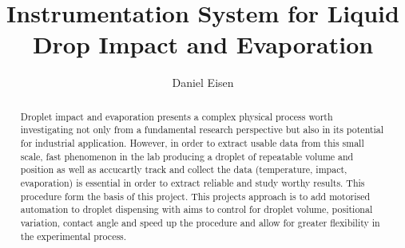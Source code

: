 \documentclass[11pt, a4paper, twoside, openright]{report}
\title{Instrumentation System for Liquid Drop Impact and Evaporation}
\author{Daniel Eisen}
\date{}
\begin{document}
\frontmatter

\begin{abstract}

    Droplet impact and evaporation presents a complex physical process worth investigating not only from a fundamental research perspective but also in its potential for industrial application. However, in order to extract usable data from this small scale, fast phenomenon in the lab producing a droplet of repeatable volume and position as well as accucartly track and collect the data (temperature, impact, evaporation) is essential in order to extract reliable and study worthy results. This procedure form the basis of this project.
    This projects approach is to add motorised automation to droplet dispensing with aims to control for droplet volume, positional variation, contact angle and speed up the procedure and allow for greater flexibility in the experimental process.


\end{abstract}


\maketitle



\tableofcontents

\mainmatter







\backmatter



\end{document}

